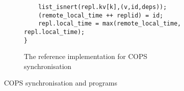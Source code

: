 \begin{figure}
\begin{subfigure}{\textwidth}
\begin{lstlisting}
    list_isnert(repl.kv[k],(v,id,deps));
    (remote_local_time ++ replid) = id;
    repl.local_time = max(remote_local_time, repl.local_time);
}
\end{lstlisting}

\caption{The reference implementation for COPS synchronisation}
\label{lst:cops-receive-msg}

\end{subfigure}

\hrulefill

\caption{COPS synchronisation and programs}

\end{figure}
